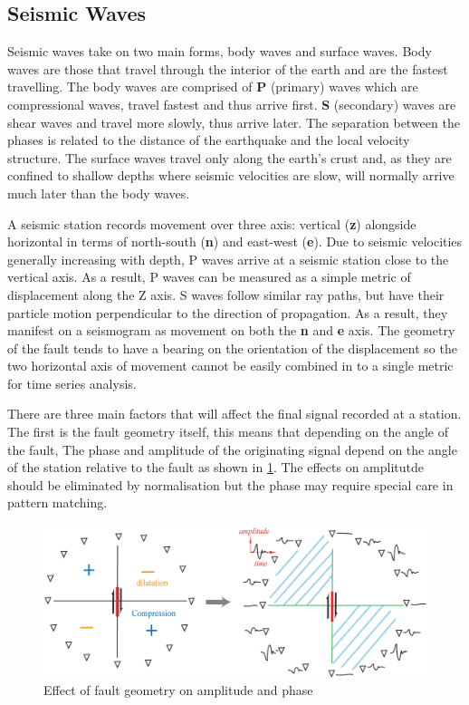 \documentclass[../report.tex]{subfiles}
\begin{document}
	\subsection{Seismic Waves}
	\label{sec:seismicwaves}
	Seismic waves take on two main forms, body waves and surface waves.  Body waves are those that travel through the interior of the earth and are the fastest travelling.  The body waves are comprised of \textbf{P} (primary) waves which are compressional waves, travel fastest and thus arrive first.  \textbf{S} (secondary) waves are shear waves and travel more slowly, thus arrive later.  The separation between the phases is related to the distance of the earthquake and the local velocity structure. The surface waves travel only along the earth's crust and, as they are confined to shallow depths where seismic velocities are slow, will normally arrive much later than the body waves.
	
	A seismic station records movement over three axis: vertical (\textbf{z}) alongside horizontal in terms of north-south (\textbf{n}) and east-west (\textbf{e}).  Due to seismic velocities generally increasing with depth, P waves arrive at a seismic station close to the vertical axis.  As a result, P waves can be measured as a simple metric of displacement along the Z axis.  S waves follow similar ray paths, but have their particle motion perpendicular to the direction of propagation.  As a result, they manifest on a seismogram as movement on both the \textbf{n} and \textbf{e} axis. The geometry of the fault tends to have a bearing on the orientation of the displacement so the two horizontal axis of movement cannot be easily combined in to a single metric for time series analysis.
	
	There are three main factors that will affect the final signal recorded at a station.  The first is the fault geometry itself, this means that depending on the angle of the fault, The phase and amplitude of the originating signal depend on the angle of the station relative to the fault as shown in \cref{fig:faultangle}.  The effects on amplitutde should be eliminated by normalisation but the phase may require special care in pattern matching.
	
\begin{figure}[H]
	\centering
	\includegraphics[width=1\linewidth]{img/fault_angle}
	\caption{Effect of fault geometry on amplitude and phase \citep{faultangle}}
	\label{fig:faultangle}
\end{figure}
\end{document}
